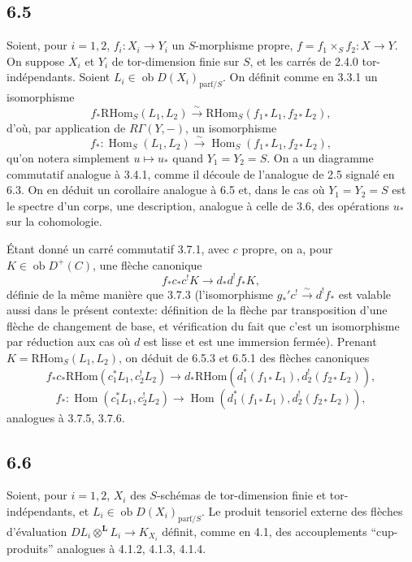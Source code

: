 \documentclass[11pt]{article}
\DeclareMathOperator{\Hom}{Hom}
\providecommand{\RHom}{\mathrm{RHom}}
\providecommand{\RHom}{\mathrm{RHom}}
\providecommand{\Hom}{\operatorname{Hom}}
\providecommand{\RHom}{\mathrm R\mathcal{H}om}
\providecommand{\RHom}{\mathrm{RHom}}
\providecommand{\Hom}{\operatorname{Hom}}
\begin{document}
\subsection*{6.5}
Soient, pour $i=1,2$, $f_i:X_i\to Y_i$ un $S$-morphisme propre, $f=f_1\times_Sf_2:X\to Y$. On suppose $X_i$ et $Y_i$ de tor-dimension finie sur $S$, et les carrés de 2.4.0 tor-indépendants. Soient $L_i\in\operatorname{ob}D(X_i)_{\mathrm{parf}/S}$. On définit comme en 3.3.1 un isomorphisme
\begin{equation}
\tag{6.5.1}
f_*\RHom_S(L_1,L_2)\xrightarrow{\sim}\RHom_S(f_{1*}L_1,f_{2*}L_2),
\end{equation}
d'où, par application de $R\Gamma(Y,-)$, un isomorphisme
\begin{equation}
\tag{6.5.2}
f_*:\Hom_S(L_1,L_2)\xrightarrow{\sim}\Hom_S(f_{1*}L_1,f_{2*}L_2),
\end{equation}
qu'on notera simplement $u\mapsto u_*$ quand $Y_1=Y_2=S$. On a un diagramme commutatif analogue à 3.4.1, comme il découle de l'analogue de 2.5 signalé en 6.3. On en déduit un corollaire analogue à 6.5 et, dans le cas où $Y_1=Y_2=S$ est le spectre d'un corps, une description, analogue à celle de 3.6, des opérations $u_*$ sur la cohomologie.

Étant donné un carré commutatif 3.7.1, avec $c$ propre, on a, pour $K\in\operatorname{ob}D^+(C)$, une flèche canonique
\begin{equation}
\tag{6.5.3}
f_*c_*c^!K\longrightarrow d_*d^!f_*K,
\end{equation}
définie de la même manière que 3.7.3 (l'isomorphisme $g_*'c^!\xrightarrow{\sim}d^!f_*$ est valable aussi dans le présent contexte: définition de la flèche par transposition d'une flèche de changement de base, et vérification du fait que c'est un isomorphisme par réduction aux cas où $d$ est lisse et est une immersion fermée). Prenant $K=\RHom_S(L_1,L_2)$, on déduit de 6.5.3 et 6.5.1 des flèches canoniques
\begin{equation}
\tag{6.5.4}
f_*c_*\RHom(c_1^*L_1,c_2^!L_2)\longrightarrow d_*\RHom(d_1^*(f_{1*}L_1),d_2^!(f_{2*}L_2)),
\end{equation}
\begin{equation}
\tag{6.5.5}
f_*:\Hom(c_1^*L_1,c_2^!L_2)\longrightarrow\Hom(d_1^*(f_{1*}L_1),d_2^!(f_{2*}L_2)),
\end{equation}
analogues à 3.7.5, 3.7.6.

\subsection*{6.6}
Soient, pour $i=1,2$, $X_i$ des $S$-schémas de tor-dimension finie et tor-indépendants, et $L_i\in\operatorname{ob}D(X_i)_{\mathrm{parf}/S}$. Le produit tensoriel externe des flèches d'évaluation $DL_i\otimes^{\mathbf L}L_i\to K_{X_i}$ définit, comme en 4.1, des accouplements ``cup-produits'' analogues à 4.1.2, 4.1.3, 4.1.4.
\end{document}
